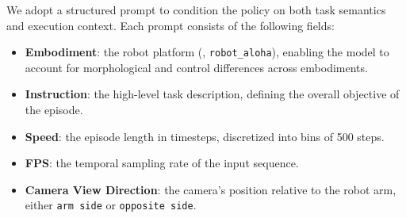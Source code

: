 
We adopt a structured prompt to condition the policy on both task semantics and execution context. 
Each prompt consists of the following fields:
\begin{itemize}[leftmargin=*,topsep=2pt,itemsep=1pt]
    \item \textbf{Embodiment}: the robot platform (\eg, \texttt{robot\_aloha}), enabling the model to account for morphological and control differences across embodiments.
    \item \textbf{Instruction}: the high-level task description, defining the overall objective of the episode.
    \item \textbf{Speed}: the episode length in timesteps, discretized into bins of 500 steps.
    \item \textbf{FPS}: the temporal sampling rate of the input sequence.
    \item \textbf{Camera View Direction}: the camera's position relative to the robot arm, either \texttt{arm side} or \texttt{opposite side}.
    
\end{itemize}
    
    


